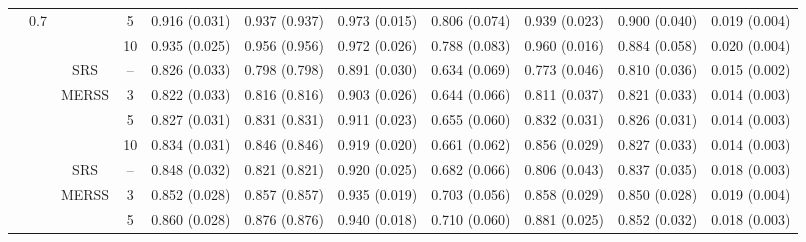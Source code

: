 \documentclass[twoside]{article}
\begin{document}
\begin{table}[!htb]
{\begin{tabular}{c c c c c c c c c c c}
    &               0.7       &                                          &  5    &
   0.916 (0.031) & 0.937 (0.937) & 0.973 (0.015) & 0.806 (0.074) & 0.939 (0.023) & 0.900 (0.040)& 0.019 (0.004)  \\


    &                      &                                          &  10   &
  0.935 (0.025) & 0.956 (0.956) & 0.972 (0.026) & 0.788 (0.083) & 0.960 (0.016) & 0.884 (0.058)& 0.020 (0.004)  \\


  \bottomrule 
    \multirow{27}{*}{} & 
    \multirow{9}{*}{ }  & 
    \multirow{1}{*}{SRS} & -- 
 &0.826 (0.033) & 0.798 (0.798) & 0.891 (0.030) & 0.634 (0.069) & 0.773 (0.046) & 0.810 (0.036)& 0.015 (0.002)  \\

   
    \cmidrule(lr){3-11}
    &                      & \multirow{3}{*}{MERSS}   &  3   & 
   0.822 (0.033) & 0.816 (0.816) & 0.903 (0.026) & 0.644 (0.066) & 0.811 (0.037) & 0.821 (0.033)& 0.014 (0.003)  \\


    &         0.3             &                                          &  5    &
    0.827 (0.031) & 0.831 (0.831) & 0.911 (0.023) & 0.655 (0.060) & 0.832 (0.031) & 0.826 (0.031)& 0.014 (0.003)  \\


    &                      &                                          &  10   &
  0.834 (0.031) & 0.846 (0.846) & 0.919 (0.020) & 0.661 (0.062) & 0.856 (0.029) & 0.827 (0.033)& 0.014 (0.003)  \\

    
 \cmidrule(lr){2-11}
  &\multirow{9}{*}{ }  & 
   \multirow{1}{*}{SRS} & -- 
 &0.848 (0.032) & 0.821 (0.821) & 0.920 (0.025) & 0.682 (0.066) & 0.806 (0.043) & 0.837 (0.035)& 0.018 (0.003)  \\

    
    \cmidrule(lr){3-11}
    &                      & \multirow{3}{*}{MERSS}   &  3   & 
   0.852 (0.028) & 0.857 (0.857) & 0.935 (0.019) & 0.703 (0.056) & 0.858 (0.029) & 0.850 (0.028)& 0.019 (0.004)  \\


  300 &          0.5            &                                          &  5    &
 0.860 (0.028) & 0.876 (0.876) & 0.940 (0.018) & 0.710 (0.060) & 0.881 (0.025) & 0.852 (0.032)& 0.018 (0.003)  \\


\end{tabular}}
\end{table}
\end{document}
